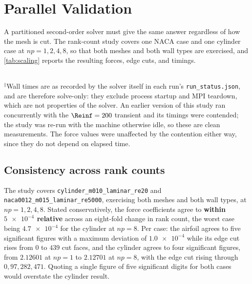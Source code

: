 \section{Parallel Validation}
\label{sec:parallel}

A partitioned second-order solver must give the same answer regardless of how the
mesh is cut. The rank-count study covers one NACA case and one cylinder case at
$np=1,2,4,8$, so that both meshes and both wall types are exercised, and
\cref{tab:scaling} reports the resulting forces, edge cuts, and timings.

\begin{table}[htbp]
  \centering
  \caption{Rank-count study on one cylinder and one airfoil case. Every run uses
  an identical fixed budget of 1500 pseudo-time steps, so the comparison is
  like-for-like, with $C_D$ from \texttt{forces.csv} and the edge cut from
  \texttt{metadata.json}. The deviation column is relative to that case's own
  $np=1$ result.}
  \label{tab:scaling}
  \small
  
  \\[2pt]
  \footnotesize $^\ddagger$Wall times are as recorded by the solver itself in each run's
  \texttt{run\_status.json}, and are therefore solve-only: they exclude process startup and
  MPI teardown, which are not properties of the solver. An earlier version of this study ran
  concurrently with the
  $\Reinf=200$ transient and its timings were contended; the study was re-run with the
  machine otherwise idle, so these are clean measurements. The force values were unaffected
  by the contention either way, since they do not depend on elapsed time.
\end{table}

\subsection{Consistency across rank counts}

The study covers \texttt{cylinder\_m010\_laminar\_re20} and
\texttt{naca0012\_m015\_laminar\_re5000}, exercising both meshes and both wall
types, at $np=1,2,4,8$. Stated conservatively, the force coefficients agree to
\textbf{within $\num{5e-4}$ relative} across an eight-fold change in rank count,
the worst case being $\num{4.7e-4}$ for the cylinder at $np=8$. Per case: the
airfoil agrees to five significant figures with a maximum deviation of
$\num{1.0e-4}$ while its edge cut rises from $0$ to $439$ cut faces, and the
cylinder agrees to four significant figures, from $2.12601$ at $np=1$ to
$2.12701$ at $np=8$, with the edge cut rising through $0, 97, 282, 471$. Quoting a
single figure of five significant digits for both cases would overstate the
cylinder result.

